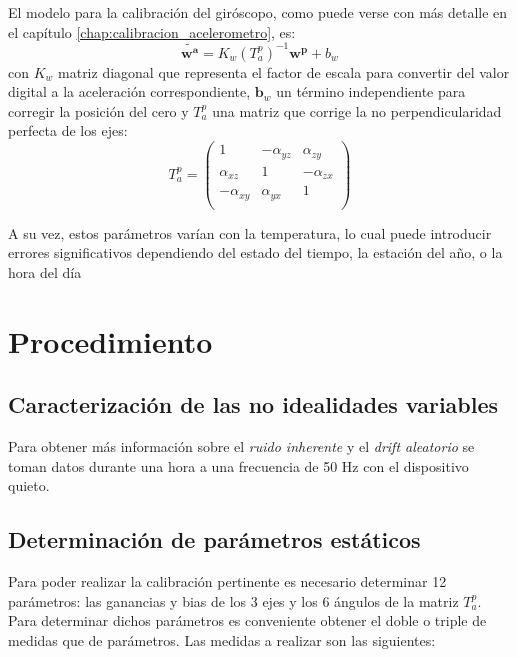 \documentclass[spanish,12pt,a4paper,titlepage]{report}
\begin{document}
El modelo para la calibración del giróscopo, como puede verse con más detalle en el capítulo \ref{chap:calibracion_acelerometro}, es:
$$\tilde{\mathbf{w^a}}=K_w(T_a^p)^{-1}\mathbf{w^p}+b_w$$
con $K_w$ matriz diagonal que representa el factor de escala para convertir del valor digital a la aceleración correspondiente, $\mathbf{b}_w$ un término independiente para corregir la posición del cero y $T^p_a$ una matriz que corrige la no perpendicularidad perfecta de los ejes:
$$T^p_a=\left( 
\begin{matrix}
1 &-\alpha_{yz} &\alpha_{zy}\\
\alpha_{xz} &1& -\alpha_{zx} \\
-\alpha_{xy} &\alpha_{yx} &1\\
\end{matrix} 
\right)$$

A su vez, estos parámetros varían con la temperatura, lo cual puede introducir errores significativos dependiendo del estado del tiempo, la estación del año, o la hora del día

\section{Procedimiento}
\subsection{Caracterización de las no idealidades variables}

Para obtener más información sobre el \emph{ruido inherente} y el \emph{drift aleatorio} se toman datos durante una hora a una frecuencia de 50 Hz con el dispositivo quieto.\\

\subsection{Determinación de parámetros estáticos}

Para poder realizar la calibración pertinente es necesario determinar 12 parámetros: las ganancias y bias de los 3 ejes y los 6 ángulos de la matriz $T^p_a$. Para determinar dichos parámetros es conveniente obtener el doble o triple de medidas que de parámetros. Las medidas a realizar son las siguientes:
\end{document}
